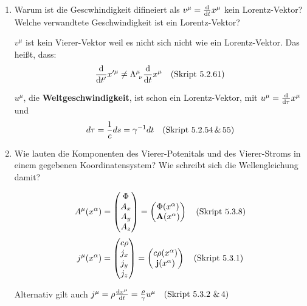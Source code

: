 \begin{enumerate}
    \item Warum ist die Gescwhindigkeit difineiert als $v^\mu=\dv t x^\mu$
      kein Lorentz-Vektor? Welche verwandtete Geschwindigkeit ist ein
      Lorentz-Vektor?

      $v^\mu$ ist kein Vierer-Vektor weil es nicht sich nicht
      wie ein Lorentz-Vektor. Das heißt, dass:
      \begin{equation*}
        \dv {t'} x'^\mu \neq \Lambda^{\mu}_{\ \nu}\dv t x^\mu
        \quad\text{(Skript 5.2.61)}
      \end{equation*}

      $u^\mu$, die \textbf{Weltgeschwindigkeit}, 
      ist schon ein Lorentz-Vektor,
      mit $u^\mu=\dv \tau x^\mu$ und
      $$d\tau=\frac{1}{c}ds=\gamma^{-1}dt \quad\text{(Skript 5.2.54\,\&\,55)}$$

    \clearpage
    \item Wie lauten die Komponenten des Vierer-Potenitals und des
      Vierer-Stroms in einem gegebenen Koordinatensystem? Wie schreibt
      sich die Wellengleichung damit?

      \begin{equation*}
        A^\mu(x^\alpha)=
        \begin{pmatrix}
          \Phi\\ A_x\\ A_y\\ A_z
        \end{pmatrix}
        =
        \begin{pmatrix}
          \Phi(x^\alpha) \\ \vb A(x^\alpha)
        \end{pmatrix}
        \quad\text{(Skript 5.3.8)}
      \end{equation*}
      \begin{equation*}
        j^\mu(x^\alpha) =
        \begin{pmatrix}
          c\rho\\ j_x\\ j_y\\ j_z
        \end{pmatrix}
        =
        \begin{pmatrix}
          c\rho(x^\alpha) \\ \vb j(x^\alpha)
        \end{pmatrix}
        \quad\text{(Skript 5.3.1)}
      \end{equation*}

      Alternativ gilt auch $j^\mu=\rho \dv{x^\mu}{t}
      =\frac{\rho}{\gamma}u^\mu \smref{5.3.2\ \&\,4}$


\end{enumerate}
